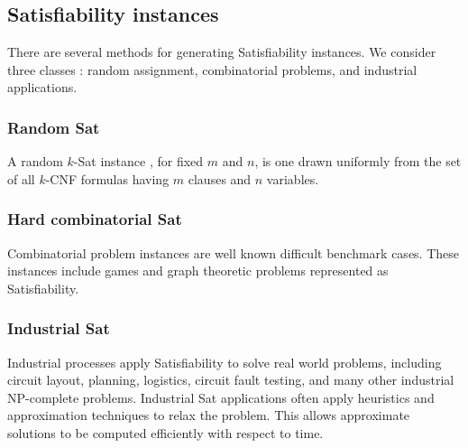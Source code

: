 	\subsection{{\sc Satisfiability} instances}
		
There are several methods for generating {\sc Satisfiability} instances.  We consider three classes \cite{satcompetition}: random assignment, combinatorial problems, and industrial applications.
	
\subsubsection{Random {\sc Sat}}
A random $k$-{\sc Sat} instance \cite{wilsonKsat}, for fixed $m$ and $n$, is one drawn uniformly from the set of all $k$-CNF formulas having $m$ clauses and $n$ variables.

		

\subsubsection{Hard combinatorial {\sc Sat}}

Combinatorial problem instances are well known difficult benchmark cases.  These instances include games and graph theoretic problems represented as {\sc Satisfiability}. 
		
\subsubsection{Industrial {\sc Sat}}

Industrial processes apply {\sc Satisfiability} to solve real world problems, including circuit layout, planning, logistics, circuit fault testing, and many other industrial \textsf{NP-complete} problems.  Industrial {\sc Sat} applications often apply heuristics and approximation techniques to relax the problem.  This allows approximate solutions to be computed efficiently with respect to time.
